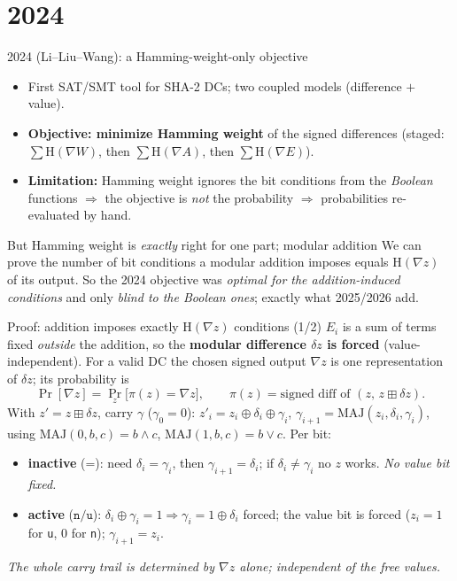 \documentclass[aspectratio=169,9pt]{beamer}
\newcommand{\nn}{\texttt{n}}
\newcommand{\uu}{\texttt{u}}
\newcommand{\eq}{\texttt{=}}
\newcommand{\hwt}{\mathrm{H}}
\newcommand{\xor}{\oplus}
\newcommand{\badd}{\boxplus}
\newcommand{\key}[1]{\textcolor{key}{\textbf{#1}}}
\begin{document}
\section{2024}

\begin{frame}{2024 (Li--Liu--Wang): a Hamming-weight-only objective}
\begin{itemize}
  \item First SAT/SMT tool for SHA-2 DCs; two coupled models (difference $+$ value).
  \item \key{Objective: minimize Hamming weight} of the signed differences (staged: $\sum\hwt(\nabla W)$, then $\sum\hwt(\nabla A)$, then $\sum\hwt(\nabla E)$).
  \item \key{Limitation:} Hamming weight ignores the bit conditions from the \emph{Boolean} functions $\Rightarrow$ the objective is \emph{not} the probability $\Rightarrow$ probabilities re-evaluated by hand.
\end{itemize}
\begin{block}{But Hamming weight is \emph{exactly} right for one part; modular addition}
 We can prove the number of bit conditions a modular addition imposes equals $\hwt(\nabla z)$ of its output. So the 2024 objective was \emph{optimal for the addition-induced conditions} and only \emph{blind to the Boolean ones}; exactly what 2025/2026 add.
\end{block}
\end{frame}

\begin{frame}{Proof: addition imposes exactly $\hwt(\nabla z)$ conditions (1/2)}
\small
$E_i$ is a sum of terms fixed \emph{outside} the addition, so the \key{modular difference $\delta z$ is forced} (value-independent). For a valid DC the chosen signed output $\nabla z$ is one representation of $\delta z$; its probability is
\[
\Pr[\nabla z] = \Pr_{z}\big[\pi(z)=\nabla z\big], \qquad \pi(z)=\text{signed diff of }(z,\,z\badd\delta z).
\]
With $z'=z\badd\delta z$, carry $\gamma$ ($\gamma_0=0$): $z'_i = z_i \xor \delta_i \xor \gamma_i$, $\gamma_{i+1}=\mathrm{MAJ}(z_i,\delta_i,\gamma_i)$, using $\mathrm{MAJ}(0,b,c)=b\wedge c$, $\mathrm{MAJ}(1,b,c)=b\vee c$. Per bit:
\begin{itemize}
  \item \textbf{inactive} ($\eq$): need $\delta_i=\gamma_i$, then $\gamma_{i+1}=\delta_i$; if $\delta_i\neq\gamma_i$ no $z$ works. \emph{No value bit fixed.}
  \item \textbf{active} ($\nn/\uu$): $\delta_i\xor\gamma_i=1\Rightarrow\gamma_i=1\xor\delta_i$ forced; the value bit is forced ($z_i=1$ for \uu, $0$ for \nn); $\gamma_{i+1}=z_i$.
\end{itemize}
\centering\emph{The whole carry trail is determined by $\nabla z$ alone; independent of the free values.}
\end{frame}
\end{document}
